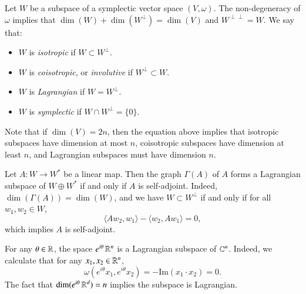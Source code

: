 %
%
%

Let $W$ be a subspace of a symplectic vector space $(V,\omega)$. The non-degeneracy of $\omega$ implies that $\dim(W) + \dim(W^\perp) = \dim(V)$ and $W^{\perp \perp} = W$. We say that:
%
\begin{itemize}
    \item $W$ is \emph{isotropic} if $W \subset W^\perp$.
    \item $W$ is \emph{coisotropic}, or \emph{involutive} if $W^\perp \subset W$.
    \item $W$ is \emph{Lagrangian} if $W = W^\perp$.
    \item $W$ is \emph{symplectic} if $W \cap W^\perp = \{ 0 \}$.
\end{itemize}
%
Note that if $\dim(V) = 2n$, then the equation above implies that isotropic subspaces have dimension at most $n$, coisotropic subspaces have dimension at least $n$, and Lagrangian subspaces must have dimension $n$.

\begin{example}
    Let $A: W \to W^*$ be a linear map. Then the graph $\Gamma(A)$ of $A$ forms a Lagrangian subspace of $W \oplus W^*$ if and only if $A$ is self-adjoint. Indeed, $\dim(\Gamma(A)) = \dim(W)$, and we have $W \subset W^\perp$ if and only if for all $w_1,w_2 \in W$,
    \[ \langle Aw_2, w_1 \rangle - \langle w_2, Aw_1 \rangle = 0, \]
    which implies $A$ is self-adjoint.
\end{example}

\begin{example}
    For any $\theta \in \operatorname{\mathbb{R}}$, the space $e^{i \theta} \operatorname{\mathbb{R}}^n$ is a Lagrangian subspace of $\operatorname{\mathbb{C}}^n$. Indeed, we calculate that for any $x_1,x_2 \in \operatorname{\mathbb{R}}^n$,
    \[ \omega(e^{i \theta} x_1, e^{i \theta} x_2) = - \text{Im} ( x_1 \cdot x_2 ) = 0. \]
    The fact that $\dim(e^{i \theta} \operatorname{\mathbb{R}}^d) = n$ implies the subspace is Lagrangian.
\end{example}


